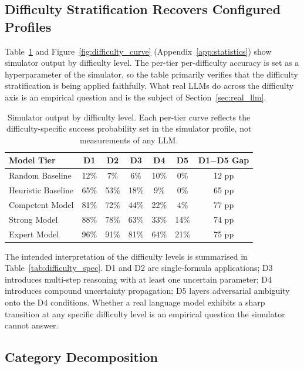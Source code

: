 \documentclass{article}
\begin{document}
\subsection{Difficulty Stratification Recovers Configured Profiles}
\label{sec:difficulty_results}

Table~\ref{tab:difficulty_scaling} and Figure~\ref{fig:difficulty_curve} (Appendix~\ref{app:statistics}) show simulator output by difficulty level. The per-tier per-difficulty accuracy is set as a hyperparameter of the simulator, so the table primarily verifies that the difficulty stratification is being applied faithfully. What real LLMs do across the difficulty axis is an empirical question and is the subject of Section~\ref{sec:real_llm}.

\begin{table}[t]
\centering
\caption{Simulator output by difficulty level. Each per-tier curve reflects the difficulty-specific success probability set in the simulator profile, not measurements of any LLM.}
\label{tab:difficulty_scaling}
\begin{tabular}{lccccc|c}
\toprule
\textbf{Model Tier} & \textbf{D1} & \textbf{D2} & \textbf{D3} & \textbf{D4} & \textbf{D5} & \textbf{D1$-$D5 Gap} \\
\midrule
Random Baseline & 12\% & 7\% & 6\% & 10\% & 0\% & 12 pp \\
Heuristic Baseline & 65\% & 53\% & 18\% & 9\% & 0\% & 65 pp \\
Competent Model & 81\% & 72\% & 44\% & 22\% & 4\% & 77 pp \\
Strong Model & 88\% & 78\% & 63\% & 33\% & 14\% & 74 pp \\
Expert Model & 96\% & 91\% & 81\% & 64\% & 21\% & 75 pp \\
\bottomrule
\end{tabular}
\end{table}

The intended interpretation of the difficulty levels is summarised in Table~\ref{tab:difficulty_spec}. D1 and D2 are single-formula applications; D3 introduces multi-step reasoning with at least one uncertain parameter; D4 introduces compound uncertainty propagation; D5 layers adversarial ambiguity onto the D4 conditions. Whether a real language model exhibits a sharp transition at any specific difficulty level is an empirical question the simulator cannot answer.

\subsection{Category Decomposition}
\label{sec:category_results}
\end{document}
